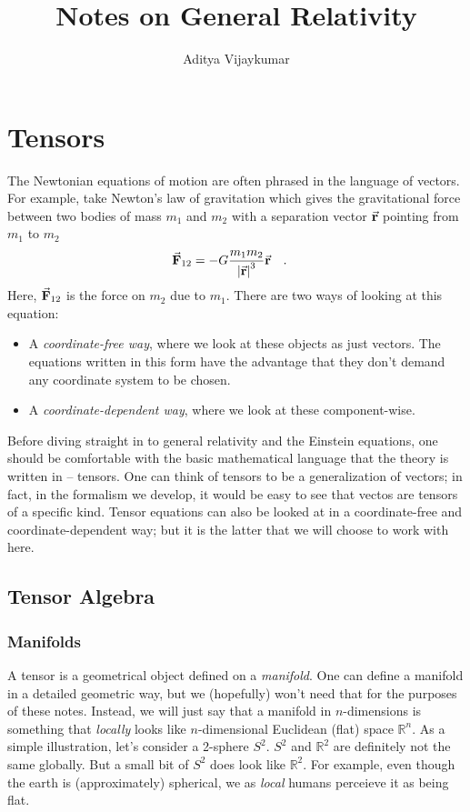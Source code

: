 \documentclass[a4paper,11pt]{article}
\title{\textbf{Notes on General Relativity}}
\author{Aditya Vijaykumar}
\affiliation{International Centre for Theoretical Sciences, Bengaluru, India.}
\begin{document}
\maketitle
\section{Tensors}
The Newtonian equations of motion are often phrased in the language of vectors. For example, take Newton's law of gravitation which gives the gravitational force between two bodies of mass $ m_1 $ and $ m_2 $ with a separation vector $ \va{r} $ pointing from $ m_1 $ to $ m_2 $
\begin{equation}\label{key}
\va{F}_{12} = - G \dfrac{m_1 m_2}{\abs{\va{r}}^3} \va{r}  \qq{.}
\end{equation}
Here, $ \va{F}_{12} $ is the force on $ m_2 $ due to $ m_1 $. There are two ways of looking at this equation:
\begin{itemize}
	\item A \textit{coordinate-free way}, where we look at these objects as just vectors. The equations written in this form have the advantage that they don't demand any coordinate system to be chosen.
	\item A \textit{coordinate-dependent way}, where we look at these component-wise.
\end{itemize}

Before diving straight in to general relativity and the Einstein equations, one should be comfortable with the basic mathematical language that the theory is written in -- tensors. One can think of tensors to be a generalization of vectors; in fact, in the formalism we develop, it would be easy to see that vectos are tensors of a specific kind. Tensor equations can also be looked at in a coordinate-free and coordinate-dependent way; but it is the latter that we will choose to work with here.
\subsection{Tensor Algebra}
\subsubsection{Manifolds}
A tensor is a geometrical object defined on a \textit{manifold}. One can define a manifold in a detailed geometric way, but we (hopefully) won't need that for the purposes of these notes. Instead, we will just say that a manifold in $ n $-dimensions is something that \textit{locally} looks like $ n $-dimensional Euclidean (flat) space $\mathbb{R}^n $. As a simple illustration, let's consider a 2-sphere $ S^2 $. $ S^2 $ and $ \mathbb{R}^2 $ are definitely not the same globally. But a small bit of $ S^2 $ does look like $ \mathbb{R}^2 $. For example, even though the earth is (approximately) spherical, we as \textit{local} humans perceieve it as being flat.
\end{document}

